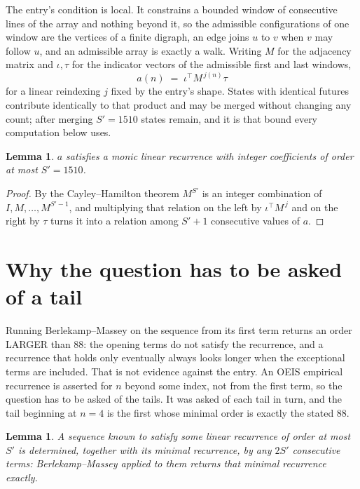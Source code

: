 \documentclass[11pt,a4paper]{article}
\theoremstyle{plain}
\newtheorem{lemma}[theorem]{Lemma}
\theoremstyle{definition}
\begin{document}
The entry's condition is local. It constrains a bounded window of consecutive lines of the
array and nothing beyond it, so the admissible configurations of one window are the vertices of
a finite digraph, an edge joins $u$ to $v$ when $v$ may follow $u$, and an admissible array is
exactly a walk. Writing $M$ for the adjacency matrix and $\iota,\tau$ for the indicator vectors
of the admissible first and last windows,
\[
a(n)\;=\;\iota^{\!\top}M^{\,j(n)}\tau
\]
for a linear reindexing $j$ fixed by the entry's shape. States with identical futures
contribute identically to that product and may be merged without changing any count; after
merging $S'=1510$ states remain, and it is that bound every computation below uses.

\begin{lemma}\label{lem:cf}
$a$ satisfies a monic linear recurrence with integer coefficients of order at most $S'=1510$.
\end{lemma}

\begin{proof}
By the Cayley--Hamilton theorem $M^{S'}$ is an integer combination of $I,M,\dots,M^{S'-1}$,
and multiplying that relation on the left by $\iota^{\!\top}M^{\,j}$ and on the right by
$\tau$ turns it into a relation among $S'+1$ consecutive values of $a$.
\end{proof}

\section{Why the question has to be asked of a tail}

Running Berlekamp--Massey on the sequence from its first term returns an order LARGER than $88$: the opening terms do not satisfy the recurrence, and a recurrence that holds only eventually always looks longer when the exceptional terms are included. That is not evidence against the entry. An OEIS empirical recurrence is asserted for $n$ beyond some index, not from the first term, so the question has to be asked of the tails. It was asked of each tail in turn, and the tail beginning at $n=4$ is the first whose minimal order is exactly the stated $88$.

\begin{lemma}\label{lem:bm}
A sequence known to satisfy some linear recurrence of order at most $S'$ is determined,
together with its minimal recurrence, by any $2S'$ consecutive terms: Berlekamp--Massey applied
to them returns that minimal recurrence exactly.
\end{lemma}
\end{document}
